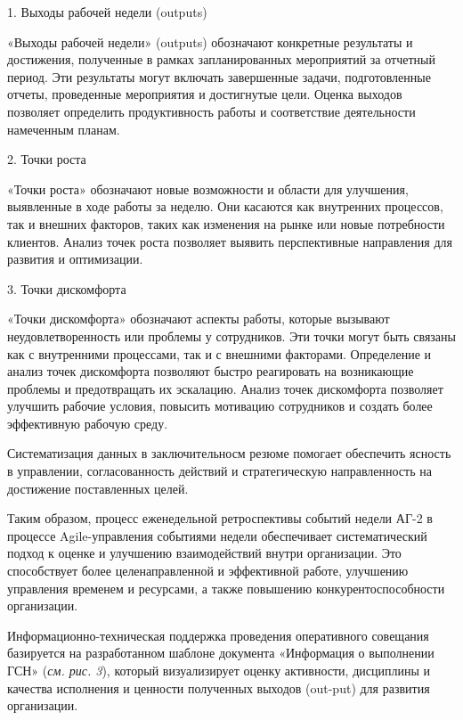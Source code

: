 1. Выходы рабочей недели (outputs)

«Выходы рабочей недели» (outputs) обозначают конкретные результаты и
достижения, полученные в рамках запланированных мероприятий за отчетный
период. Эти результаты могут включать завершенные задачи, подготовленные
отчеты, проведенные мероприятия и достигнутые цели. Оценка выходов
позволяет определить продуктивность работы и соответствие деятельности
намеченным планам.

2. Точки роста

«Точки роста» обозначают новые возможности и области для улучшения,
выявленные в ходе работы за неделю. Они касаются как внутренних
процессов, так и внешних факторов, таких как изменения на рынке или
новые потребности клиентов. Анализ точек роста позволяет выявить
перспективные направления для развития и оптимизации.

3. Точки дискомфорта

«Точки дискомфорта» обозначают аспекты работы, которые вызывают
неудовлетворенность или проблемы у сотрудников. Эти точки могут быть
связаны как с внутренними процессами, так и с внешними факторами.
Определение и анализ точек дискомфорта позволяют быстро реагировать на
возникающие проблемы и предотвращать их эскалацию. Анализ точек
дискомфорта позволяет улучшить рабочие условия, повысить мотивацию
сотрудников и создать более эффективную рабочую среду.

Систематизация данных в заключительносм резюме помогает обеспечить
ясность в управлении, согласованность действий и стратегическую
направленность на достижение поставленных целей.

Таким образом, процесс еженедельной ретроспективы событий недели АГ-2 в
процессе Agile-управления событиями недели обеспечивает систематический
подход к оценке и улучшению взаимодействий внутри организации. Это
способствует более целенаправленной и эффективной работе, улучшению
управления временем и ресурсами, а также повышению конкурентоспособности
организации.

Информационно-техническая поддержка проведения оперативного совещания
базируется на разработанном шаблоне документа «Информация о выполнении
ГСН» (\emph{см. рис. 3}), который визуализирует оценку активности,
дисциплины и качества исполнения и ценности полученных выходов (out-put)
для развития организации.

